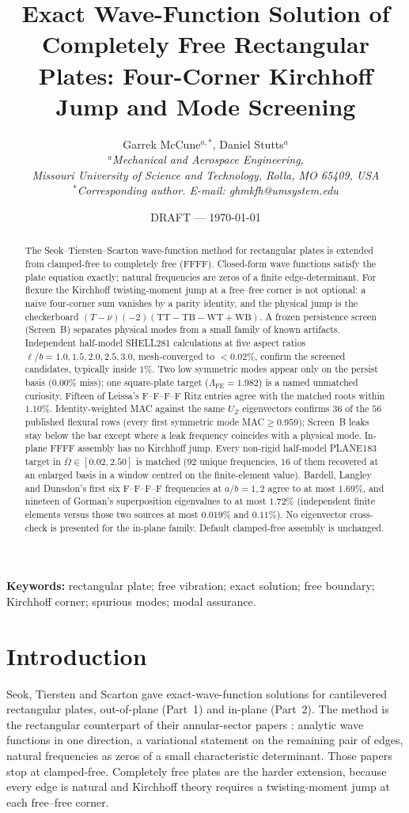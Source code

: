 \documentclass[11pt]{article}
\title{\bfseries Exact Wave-Function Solution of Completely Free Rectangular
Plates: Four-Corner Kirchhoff Jump and Mode Screening}
\author{Garrek McCune$^{a,*}$, Daniel Stutts$^{a}$\\
\small\itshape $^a$Mechanical and Aerospace Engineering,\\
Missouri University of Science and Technology, Rolla, MO 65409, USA\\
\small\upshape $^*$Corresponding author. E-mail: ghmkfh@umsystem.edu}
\date{DRAFT --- \today}
\begin{document}
\maketitle

\begin{abstract}
The Seok--Tiersten--Scarton wave-function method for rectangular plates is
extended from clamped-free to completely free (FFFF). Closed-form wave
functions satisfy the plate equation exactly; natural frequencies are
zeros of a finite edge-determinant. For flexure the Kirchhoff
twisting-moment jump at a free--free corner is not optional: a naive
four-corner sum vanishes by a parity identity, and the physical jump is
the checkerboard $(T-\nu)(-2)(\mathrm{TT}-\mathrm{TB}-\mathrm{WT}+\mathrm{WB})$.
A frozen persistence screen (Screen~B) separates physical modes from a
small family of known artifacts. Independent half-model SHELL281
calculations at five aspect ratios $\ell/b=1.0,1.5,2.0,2.5,3.0$,
mesh-converged to $<0.02\%$, confirm the screened candidates, typically
inside $1\%$. Two low symmetric modes appear only on the persist basis
($0.00\%$ miss); one square-plate target ($\Lambda_{\mathrm{FE}}=1.982$)
is a named unmatched curiosity. Fifteen of Leissa's F--F--F--F Ritz entries
agree with the matched roots within $1.10\%$. Identity-weighted MAC
against the same $U_Z$ eigenvectors confirms $36$ of the $56$ published
flexural rows (every first symmetric mode MAC${}\ge 0.959$); Screen~B
leaks stay below the bar except where a leak frequency coincides with a
physical mode. In-plane FFFF assembly has no Kirchhoff jump. Every
non-rigid half-model PLANE183 target in $\bar\Omega\in[0.02,2.50]$ is
matched ($92$ unique frequencies, $16$ of them recovered at an enlarged
basis in a window centred on the finite-element value). Bardell, Langley
and Dunsdon's first six F--F--F--F frequencies at $a/b=1,2$ agree to at
most $1.69\%$, and nineteen of Gorman's superposition eigenvalues to at
most $1.72\%$ (independent finite elements versus those two sources at
most $0.019\%$ and $0.11\%$). No eigenvector cross-check is presented
for the in-plane family. Default clamped-free assembly is unchanged.
\end{abstract}

\noindent\textbf{Keywords:} rectangular plate; free vibration; exact
solution; free boundary; Kirchhoff corner; spurious modes; modal assurance.

\section{Introduction}\label{sec:intro}
Seok, Tiersten and Scarton \cite{seok3,seok4} gave exact-wave-function
solutions for cantilevered rectangular plates, out-of-plane (Part~1) and
in-plane (Part~2). The method is the rectangular counterpart of their
annular-sector papers \cite{seok1,seok2}: analytic wave functions in one
direction, a variational statement on the remaining pair of edges, natural
frequencies as zeros of a small characteristic determinant. Those papers
stop at clamped-free. Completely free plates are the harder extension,
because every edge is natural and Kirchhoff theory requires a
twisting-moment jump at each free--free corner.
\end{document}
